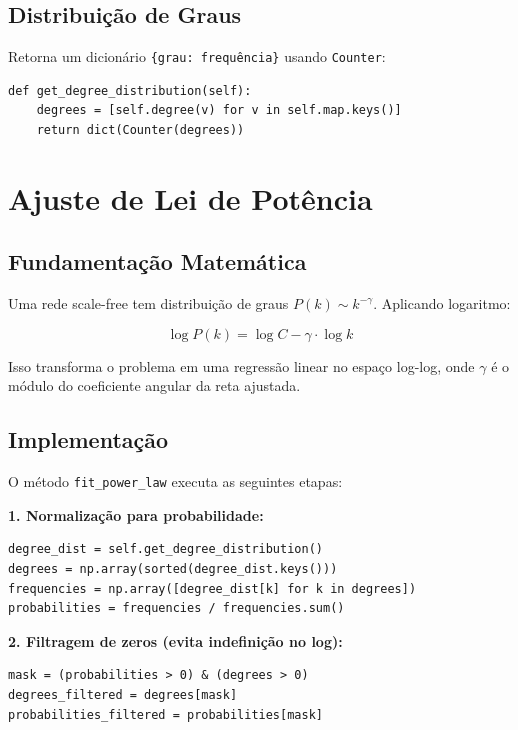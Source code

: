 \documentclass[12pt,a4paper]{article}
\begin{document}
\subsection{Distribuição de Graus}

Retorna um dicionário \texttt{\{grau: frequência\}} usando \texttt{Counter}:

\begin{lstlisting}
def get_degree_distribution(self):
    degrees = [self.degree(v) for v in self.map.keys()]
    return dict(Counter(degrees))
\end{lstlisting}

\section{Ajuste de Lei de Potência}

\subsection{Fundamentação Matemática}

Uma rede scale-free tem distribuição de graus $P(k) \sim k^{-\gamma}$. Aplicando logaritmo:

\begin{equation}
    \log P(k) = \log C - \gamma \cdot \log k
\end{equation}

Isso transforma o problema em uma regressão linear no espaço log-log, onde $\gamma$ é o módulo do coeficiente angular da reta ajustada.

\subsection{Implementação}

O método \texttt{fit\_power\_law} executa as seguintes etapas:

\textbf{1. Normalização para probabilidade:}
\begin{lstlisting}
degree_dist = self.get_degree_distribution()
degrees = np.array(sorted(degree_dist.keys()))
frequencies = np.array([degree_dist[k] for k in degrees])
probabilities = frequencies / frequencies.sum()
\end{lstlisting}

\textbf{2. Filtragem de zeros (evita indefinição no log):}
\begin{lstlisting}
mask = (probabilities > 0) & (degrees > 0)
degrees_filtered = degrees[mask]
probabilities_filtered = probabilities[mask]
\end{lstlisting}
\end{document}
